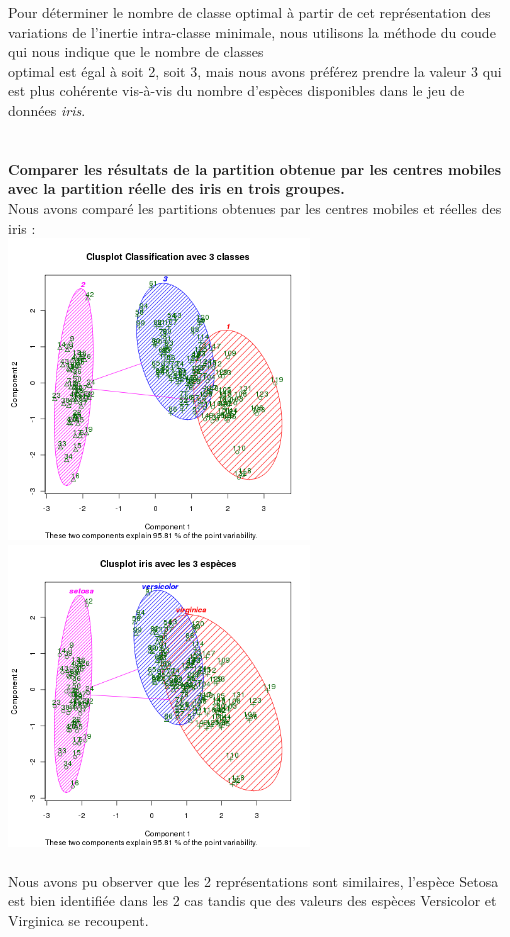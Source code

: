 \documentclass[a4paper, 10pt]{article}
\begin{document}
Pour d\'eterminer le nombre de classe optimal \`a partir de cet repr\'esentation des variations de l'inertie intra-classe minimale,
nous utilisons la m\'ethode du coude qui nous indique que le nombre de classes\\optimal est \'egal \`a soit 2, soit 3,
mais nous avons pr\'ef\'erez prendre la valeur 3 qui est plus coh\'erente vis-\`a-vis du nombre d'esp\`eces disponibles dans
le jeu de donn\'ees \textit{iris}.\\ \\ \\
\textbf{Comparer les r\'esultats de la partition obtenue par les centres mobiles avec la partition r\'eelle des iris en trois groupes.}\\
Nous avons compar\'e les partitions obtenues par les centres mobiles et r\'eelles des iris :\\
\includegraphics[height = 8cm, width = 8cm]{plots/clusplot_kmeans_4.png}
\includegraphics[height = 8cm, width = 8cm]{plots/clusplot_iris_10.png}\\ \\
Nous avons pu observer que les 2 repr\'esentations sont similaires, l'esp\`ece Setosa est bien identifi\'ee dans les 2 cas tandis que
des valeurs des esp\`eces Versicolor et Virginica se recoupent.\\ \\ \\
\end{document}
